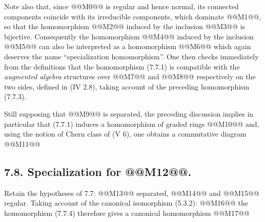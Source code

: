 
Note also that, since @@M0@@ is regular and hence normal, its connected components coincide with its irreducible components, which dominate @@M1@@, so that the homomorphism @@M2@@ induced by the inclusion @@M3@@ is bijective. Consequently the homomorphism @@M4@@ induced by the inclusion @@M5@@ can also be interpreted as a homomorphism
@@M6@@
which again deserves the name ``specialization homomorphism''. One then checks immediately from the definitions that the homomorphism (7.7.1) is compatible with the \emph{augmented algebra} structures over @@M7@@ and @@M8@@ respectively on the two sides, defined in (IV 2.8), taking account of the preceding homomorphism (7.7.3).

Still supposing that @@M9@@ is separated, the preceding discussion implies in particular that (7.7.1) induces a homomorphism of graded rings
@@M10@@
and, using the notion of Chern class of (V 6), one obtains a commutative diagram
@@M11@@

\subsection*{7.8. Specialization for @@M12@@.}
Retain the hypotheses of 7.7: @@M13@@ separated, @@M14@@ and @@M15@@ regular. Taking account of the canonical isomorphism (5.3.2):
@@M16@@
the homomorphism (7.7.4) therefore gives a canonical homomorphism
@@M17@@
